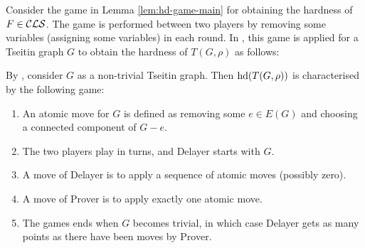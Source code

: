 \documentclass{report}
\begin{document}
Consider the game in Lemma \ref{lem:hd-game-main} for obtaining the hardness of $F \in \mathcal{CLS}$. The game is performed between two players by removing some variables (assigning some variables) in each round. In \cite{BeyersdorffKullmann2014PHP}, this game is applied for a Tseitin graph $G$ to obtain the hardness of $T(G,\rho)$ as follows:



\begin{lem}\label{lem:game-tseitin-hd}
By \cite{BeyersdorffKullmann2014PHP}, consider  $G$ as a non-trivial Tseitin graph. Then $\operatorname{hd}(T(G,\rho))$ is characterised by the following game:
  \begin{enumerate}
  \item An atomic move for $G$ is defined as removing some $e \in E(G)$ and choosing a connected component of $G - e$. 
  \item The two players play in turns, and Delayer starts with $G$.
  \item A move of Delayer is to apply a sequence of atomic moves (possibly zero).
  \item A move of Prover is to apply exactly one atomic move.
  \item The games ends when $G$ becomes trivial, in which case Delayer gets as many points as there have been moves by Prover.
  \end{enumerate}
\end{lem}
  
\end{document}
